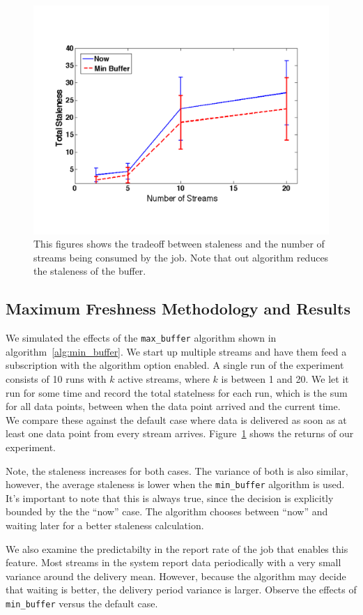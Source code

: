 \begin{figure}[h!] %
\centering
\includegraphics[width=0.75\columnwidth]{figs/staleness_vs_numstreams}
\caption{This figures shows the tradeoff between staleness and the number of streams being consumed by the job.  Note 
that out algorithm reduces the staleness of the buffer.}
\label{fig:stalevsstreams}
\end{figure}

\subsection{Maximum Freshness Methodology and Results}

We simulated the effects of the \texttt{max\_buffer} algorithm shown in algorithm~\ref{alg:min_buffer}.  We start up multiple streams and
have them feed a subscription with the algorithm option enabled.  A single run of the experiment consists of 10 runs with $k$ active streams,
where $k$ is between 1 and 20.  We let it run for some time and record the total statelness for each run, which is the sum for all data points, between
when the data point arrived and the current time.  We compare these against the default case where data is delivered as soon as at least one data point from every stream arrives.  Figure~\ref{fig:stalevsstreams} shows the returns of our experiment.

Note, the staleness increases for both cases.  The variance of both is also similar, however, the average staleness is lower 
when the \texttt{min\_buffer} algorithm is used.  It's important to note that this is always true, since the decision is explicitly
bounded by the the ``now'' case.  The algorithm chooses between ``now'' and waiting later for a better staleness calculation.

We also examine the predictabilty in the report rate of the job that enables this feature.  Most streams in the system report data periodically
with a very small variance around the delivery mean.  However, because the algorithm may decide that waiting is better, the delivery
period variance is larger.  Observe the effects of \texttt{min\_buffer} versus the default case.

